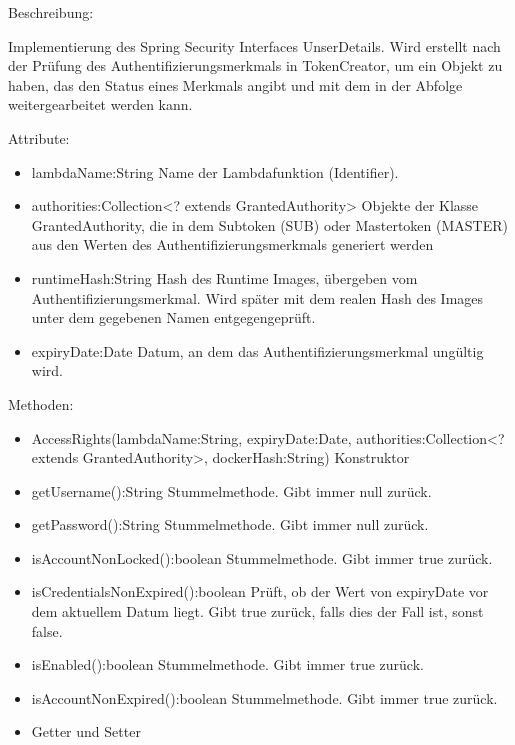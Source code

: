 \documentclass[a4paper,20pt,oneside]{book}
\begin{document}
	\vspace{0.5cm}
	\raggedright
	Beschreibung:
	
	Implementierung des Spring Security Interfaces UnserDetails. Wird erstellt nach der Prüfung des Authentifizierungsmerkmals in TokenCreator, um ein Objekt zu haben, das den Status eines Merkmals angibt und mit dem in der Abfolge weitergearbeitet werden kann.
	
	\vspace{0.5cm}
	Attribute:
	\begin{itemize}
	\item lambdaName:String \linebreak
	Name der Lambdafunktion (Identifier).
	\item authorities:Collection<? extends GrantedAuthority> \linebreak
	Objekte der Klasse GrantedAuthority, die in dem Subtoken (SUB) oder Mastertoken (MASTER) aus den Werten des Authentifizierungsmerkmals generiert werden
	\item runtimeHash:String \linebreak
	Hash des Runtime Images, übergeben vom Authentifizierungsmerkmal. Wird später mit dem realen Hash des Images unter dem gegebenen Namen entgegengeprüft.
	\item expiryDate:Date \linebreak
	Datum, an dem das Authentifizierungsmerkmal ungültig wird.
	\end{itemize}
	
	Methoden:
	\begin{itemize}
	\item AccessRights(lambdaName:String, expiryDate:Date, authorities:Collection<? extends GrantedAuthority>, dockerHash:String) \linebreak
	Konstruktor
	\item getUsername():String\linebreak
	Stummelmethode. Gibt immer null zurück.
	\item getPassword():String \linebreak
	Stummelmethode. Gibt immer null zurück.
	\item isAccountNonLocked():boolean \linebreak
	Stummelmethode. Gibt immer true zurück.
	\item isCredentialsNonExpired():boolean\linebreak
	Prüft, ob der Wert von expiryDate vor dem aktuellem Datum liegt. Gibt true zurück, falls dies der Fall ist, sonst false.
	\item isEnabled():boolean\linebreak
	Stummelmethode. Gibt immer true zurück.
	\item isAccountNonExpired():boolean \linebreak
	Stummelmethode. Gibt immer true zurück.
	\item Getter und Setter
	\end{itemize}
	
\end{document}
